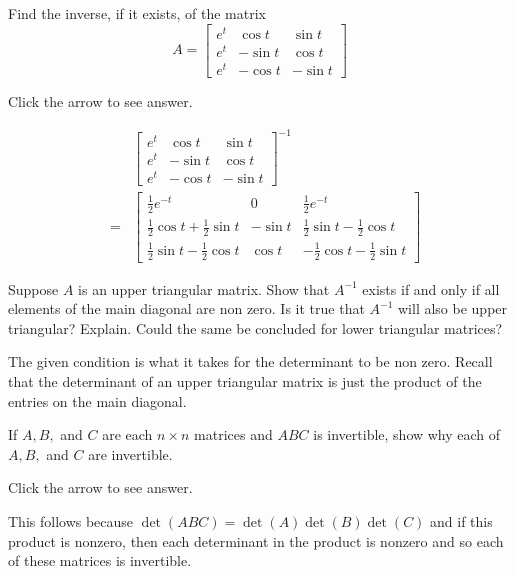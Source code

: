 \documentclass{ximera}
\begin{document}
\begin{problem}\label{prb:7.39} Find the inverse, if it exists, of the matrix
\begin{equation*}
A =
\left[
\begin{array}{ccc}
e^{t} & \cos t & \sin t \\
e^{t} & -\sin t & \cos t \\
e^{t} & -\cos t & -\sin t
\end{array}
\right]
\end{equation*}

Click the arrow to see answer.
\begin{expandable}
\begin{eqnarray*}
&&\left[
\begin{array}{ccc}
e^{t} & \cos t & \sin t \\
e^{t} & -\sin t & \cos t \\
e^{t} & -\cos t & -\sin t
\end{array}
\right] ^{-1} \\
&=&\left[
\begin{array}{ccc}
\frac{1}{2}e^{-t} & 0 & \frac{1}{2}e^{-t} \\
\frac{1}{2}\cos t+\frac{1}{2}\sin t & -\sin t & \frac{1}{2}\sin t-\frac{1}{2}
\cos t \\
\frac{1}{2}\sin t-\frac{1}{2}\cos t & \cos t & -\frac{1}{2}\cos t-\frac{1}{2}
\sin t
\end{array}
\right]
\end{eqnarray*}
\end{expandable}
\end{problem}

\begin{problem}\label{prb:7.40} Suppose $A$ is an upper triangular matrix. Show that $A^{-1}$ exists
if and only if all elements of the main diagonal are non zero. Is it true
that $A^{-1}$ will also be upper triangular? Explain. Could the same be concluded for lower triangular matrices?
\begin{hint}
The given condition is what it takes for the
determinant to be non zero. Recall that the determinant of an upper
triangular matrix is just the product of the entries on the main diagonal.
\end{hint}
\end{problem}

\begin{problem}\label{prb:7.41} If $A,B,$ and $C$ are each $n\times n$ matrices and $ABC$ is
invertible, show why each of $A,B,$ and $C$ are invertible.

Click the arrow to see answer.
\begin{expandable}
This follows
because $\det \left( ABC\right) =\det \left( A\right) \det \left( B\right)
\det \left( C\right) $ and if this product is nonzero, then each determinant
in the product is nonzero and so each of these matrices is invertible.
\end{expandable}
\end{problem}
\end{document}
